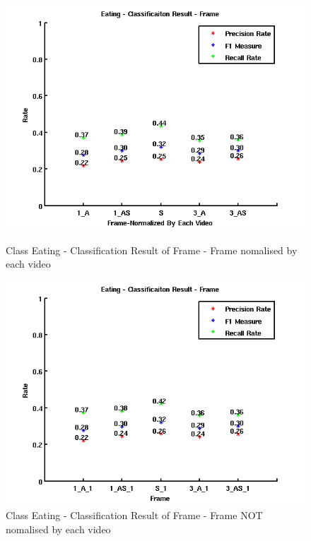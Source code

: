 \newpage
\begin{figure}[ht]
\centering
\begin{minipage}{.5\textwidth}
  \centering
  \captionsetup{justification=centering,margin=1cm}
  \includegraphics[width=\linewidth]{imgs/Result_Eating_Frame.png}
  \caption{Class Eating - Classification Result of Frame - Frame nomalised by each video}
  \label{fig:REF}
\end{minipage}%
\begin{minipage}{.5\textwidth}
  \centering
  \captionsetup{justification=centering,margin=1cm}
  \includegraphics[width=\linewidth]{imgs/Result_Eating_Frame_1.png}
  \caption{Class Eating - Classification Result of Frame - Frame NOT nomalised by each video}
  \label{fig:REF1}
\end{minipage}
\end{figure}
